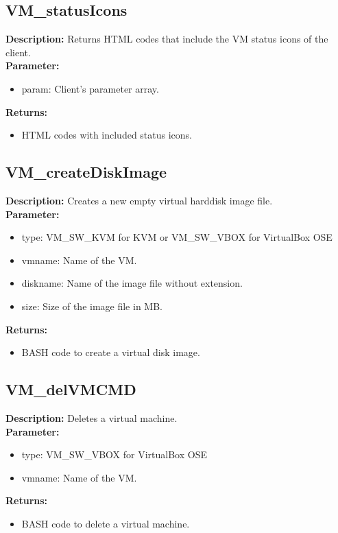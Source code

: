 \subsection{VM\_statusIcons}
\textbf{Description:} Returns HTML codes that include the VM status icons of the client.\\
\textbf{Parameter:}
\begin{itemize}
\item param: Client's parameter array.
\end{itemize}
\textbf{Returns:}
\begin{itemize}
\item HTML codes with included status icons.
\end{itemize}

\subsection{VM\_createDiskImage}
\textbf{Description:} Creates a new empty virtual harddisk image file.\\
\textbf{Parameter:}
\begin{itemize}
\item type: VM\_SW\_KVM for KVM or VM\_SW\_VBOX for VirtualBox OSE
\item vmname: Name of the VM.
\item diskname: Name of the image file without extension.
\item size: Size of the image file in MB.
\end{itemize}
\textbf{Returns:}
\begin{itemize}
\item BASH code to create a virtual disk image.
\end{itemize}

\subsection{VM\_delVMCMD}
\textbf{Description:} Deletes a virtual machine.\\
\textbf{Parameter:}
\begin{itemize}
\item type: VM\_SW\_VBOX for VirtualBox OSE
\item vmname: Name of the VM.
\end{itemize}
\textbf{Returns:}
\begin{itemize}
\item BASH code to delete a virtual machine.
\end{itemize}

